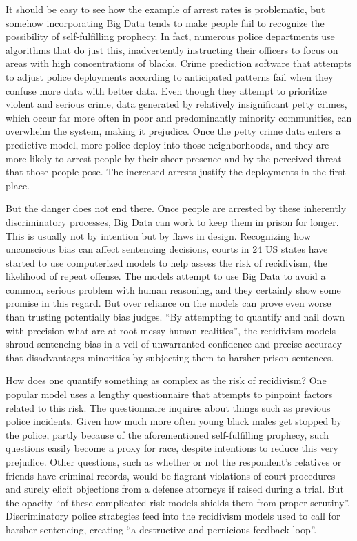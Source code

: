 \documentclass[sigconf]{acmart}
\begin{document}
It should be easy to see how the example of arrest rates is problematic, but somehow incorporating Big Data tends to make people fail to recognize the possibility of self-fulfilling prophecy. In fact, numerous police departments use algorithms that do just this, inadvertently instructing their officers to focus on areas with high concentrations of blacks. Crime prediction software that attempts to adjust police deployments according to anticipated patterns fail when they confuse more data with better data. Even though they attempt to prioritize violent and serious crime, data generated by relatively insignificant petty crimes, which occur far more often in poor and predominantly minority communities, can overwhelm the system, making it prejudice. Once the petty crime data enters a predictive model, more police deploy into those neighborhoods, and they are more likely to arrest people by their sheer presence and by the perceived threat that those people pose. The increased arrests justify the deployments in the first place\cite{Wharton2016}. 

But the danger does not end there. Once people are arrested by these inherently discriminatory processes, Big Data can work to keep them in prison for longer. This is usually not by intention but by flaws in design. Recognizing how unconscious bias can affect sentencing decisions, courts in 24 US states have started to use computerized models to help assess the risk of recidivism, the likelihood of repeat offense. The models attempt to use Big Data to avoid a common, serious problem with human reasoning, and they certainly show some promise in this regard. But over reliance on the models can prove even worse than trusting potentially bias judges. ``By attempting to quantify and nail down with precision what are at root messy human realities'', the recidivism models shroud sentencing bias in a veil of unwarranted confidence and precise accuracy that disadvantages minorities by subjecting them to harsher prison sentences\cite{Wharton2016}.

How does one quantify something as complex as the risk of recidivism? One popular model uses a lengthy questionnaire that attempts to pinpoint factors related to this risk. The questionnaire inquires about things such as previous police incidents. Given how much more often young black males get stopped by the police, partly because of the aforementioned self-fulfilling prophecy, such questions easily become a proxy for race, despite intentions to reduce this very prejudice. Other questions, such as whether or not the respondent's relatives or friends have criminal records, would be flagrant violations of court procedures and surely elicit objections from a defense attorneys if raised during a trial. But the opacity ``of these complicated risk models shields them from proper scrutiny''\cite{Wharton2016}. Discriminatory police strategies feed into the recidivism models used to call for harsher sentencing, creating ``a destructive and pernicious feedback loop''\cite{Wharton2016}.
\end{document}
